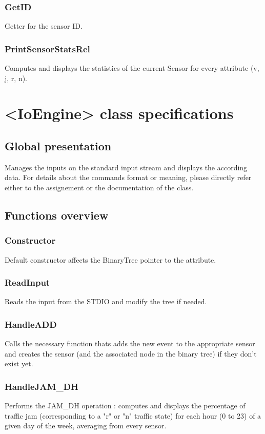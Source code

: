 \documentclass[10pt]{article}
\begin{document}
\subsubsection*{GetID}
Getter for the sensor ID.

\subsubsection*{PrintSensorStatsRel}
Computes and displays the statistics of the current Sensor for every attribute (v, j, r, n).

\section{<IoEngine> class specifications}
\subsection{Global presentation}
Manages the inputs on the standard input stream and displays the according data. For details about the commands format or meaning, please directly refer either to the assignement or the documentation of the class.

\subsection{Functions overview}

\subsubsection*{Constructor}
Default constructor affects the BinaryTree pointer to the attribute.

\subsubsection*{ReadInput}
Reads the input from the STDIO and modify the tree if needed.

\subsubsection*{HandleADD}
Calls the necessary function thats adds the new event to the appropriate sensor and creates the sensor (and the associated node in the binary tree) if they don't exist yet.

\subsubsection*{HandleJAM\_DH}
Performs the JAM\_DH operation : computes and displays the percentage of traffic jam (corresponding to a "r" or "n" traffic state) for each hour (0 to 23) of a given day of the week, averaging from every sensor.
\end{document}
